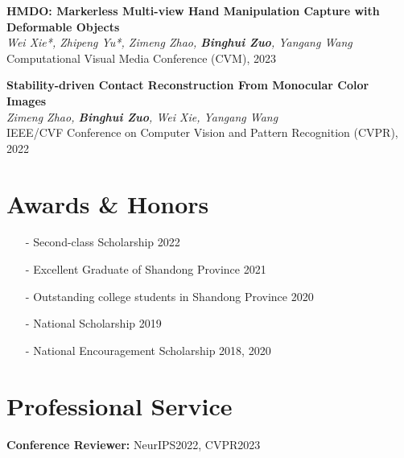 \documentclass[margin, centered]{res}
\def\myname{\textbf{Binghui Zuo}}
\begin{document}
\begin{resume}
\textbf{HMDO: Markerless Multi-view Hand Manipulation Capture with Deformable Objects}\\
\emph{Wei Xie*, Zhipeng Yu*, Zimeng Zhao, \myname, Yangang Wang}
\vspace{0.1 cm}\\
Computational Visual Media Conference (CVM), 2023

\textbf{Stability-driven Contact Reconstruction From Monocular Color Images}\\
\emph{Zimeng Zhao, \myname, Wei Xie, Yangang Wang}
\vspace{0.1 cm}\\
IEEE/CVF Conference on Computer Vision and Pattern Recognition (CVPR), 2022
   
\section{Awards \& Honors}
\begin{itemize}[leftmargin=*]
 \item[-] Second-class Scholarship \hfill 2022
 \item[-] Excellent Graduate of Shandong Province \hfill 2021
 \item[-] Outstanding college students in Shandong Province \hfill 2020
 \item[-] National Scholarship \hfill 2019
 \item[-] National Encouragement Scholarship \hfill 2018, 2020
\end{itemize}


\section{Professional Service}
\textbf{Conference Reviewer:}
NeurIPS2022, CVPR2023

\end{resume}
\end{document}
